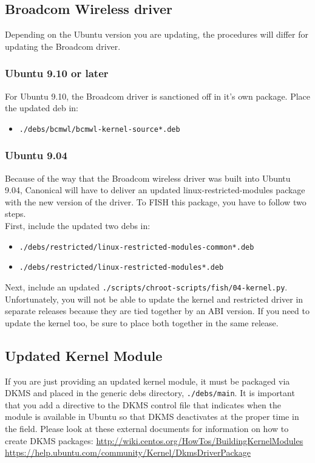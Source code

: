 \documentclass[letterpaper,10pt,titlepage]{article}
\begin{document}
\subsection{Broadcom Wireless driver}
Depending on the Ubuntu version you are updating, the procedures will differ for updating the Broadcom driver.

\subsubsection{Ubuntu 9.10 or later}
For Ubuntu 9.10, the Broadcom driver is sanctioned off in it's own package.  Place the updated deb in:
\begin{itemize}
\item \texttt{./debs/bcmwl/bcmwl-kernel-source*.deb}
\end{itemize}

\subsubsection{Ubuntu 9.04}
Because of the way that the Broadcom wireless driver was built into Ubuntu 9.04, Canonical will have to deliver an updated linux-restricted-modules package with the new version of the driver.  To FISH this package, you have to follow two steps.
\\
First, include the updated two debs in:
\begin{itemize}
\item \texttt{./debs/restricted/linux-restricted-modules-common*.deb}
\item \texttt{./debs/restricted/linux-restricted-modules*.deb}
\end{itemize}
Next, include an updated \texttt{./scripts/chroot-scripts/fish/04-kernel.py}.  Unfortunately, you will not be able to update the kernel and restricted driver in separate releases because they are tied together by an ABI version.  If you need to update the kernel too, be sure to place both together in the same release.

\subsection{Updated Kernel Module}
If you are just providing an updated kernel module, it must be packaged via DKMS and placed in the generic debs directory, \texttt{./debs/main}.  It is important that you add a directive to the DKMS control file that indicates when the module is available in Ubuntu so that DKMS deactivates at the proper time in the field.
Please look at these external documents for information on how to create DKMS packages:
\linebreak 
\url{http://wiki.centos.org/HowTos/BuildingKernelModules}
\linebreak
\url{https://help.ubuntu.com/community/Kernel/DkmsDriverPackage}
\end{document}
